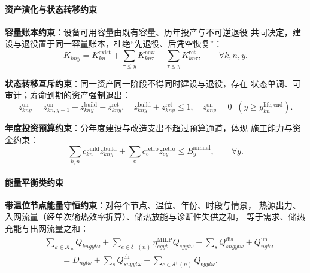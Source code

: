 \paragraph{资产演化与状态转移约束}

\textbf{容量账本约束}：设备可用容量由既有容量、历年投产与不可逆退役
共同决定，建设与退役置于同一容量账本，杜绝“先退役、后凭空恢复”：
\begin{equation}
\label{eq:cap-ledger}
K_{kny}=K^{\mathrm{exist}}_{kn}
+\sum_{\tau\le y}K^{\mathrm{new}}_{kn\tau}
-\sum_{\tau\le y}K^{\mathrm{ret}}_{kn\tau},
\qquad \forall k,n,y.
\end{equation}

\textbf{状态转移互斥约束}：同一资产同一阶段不得同时建设与退役，存在
状态单调、可审计；寿命到期的资产强制退出：
\begin{equation}
\label{eq:state-trans}
z^{\mathrm{on}}_{kny}=z^{\mathrm{on}}_{kn,y-1}
+z^{\mathrm{build}}_{kny}-z^{\mathrm{ret}}_{kny},\quad
z^{\mathrm{build}}_{kny}+z^{\mathrm{ret}}_{kny}\le 1,\quad
z^{\mathrm{on}}_{kny}=0\;\; (y\ge y^{\mathrm{life,end}}_{kn}).
\end{equation}

\textbf{年度投资预算约束}：分年度建设与改造支出不超过预算通道，体现
施工能力与资金约束：
\begin{equation}
\label{eq:budget}
\sum_{k,n}c_{kn}^{\mathrm{build}}z^{\mathrm{build}}_{kny}
+\sum_{e}c_{e}^{\mathrm{retro}}z^{\mathrm{retro}}_{ey}
\le B_y^{\mathrm{annual}},\qquad \forall y.
\end{equation}

\paragraph{能量平衡类约束}

\textbf{带温位节点能量守恒约束}：对每个节点、温位、年份、时段与情景，
热源出力、入网流量（经单次输热效率折算）、储热放能与诊断性失供之和，
等于需求、储热充能与出网流量之和：
\begin{equation}
\label{eq:balance}
\begin{aligned}
&\sum_{k\in\mathcal K_n} Q_{kngyt\omega}
+\sum_{e\in\delta^-(n)}\eta^{\mathrm{MILP}}_{egyt}Q_{egyt\omega}
+\sum_{s}Q^{\mathrm{dis}}_{sngyt\omega}+Q^{\mathrm{un}}_{ngt\omega}
\\[-2pt]
&\qquad =D_{ngt\omega}
+\sum_{s}Q^{\mathrm{ch}}_{sngyt\omega}
+\sum_{e\in\delta^+(n)}Q_{egyt\omega}.
\end{aligned}
\end{equation}

